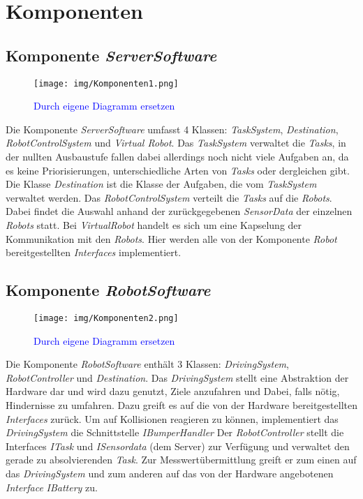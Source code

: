\section{Komponenten}

\subsection{Komponente \textit{ServerSoftware}}
\begin{figure}[H]
\centering
\texttt{[image: img/Komponenten1.png]}
\caption{\textcolor{blue}{Durch eigene Diagramm ersetzen}}
\label{KomponentenStruktur1}
\end{figure}
Die Komponente \textit{ServerSoftware} umfasst 4 Klassen: \textit{TaskSystem}, \textit{Destination}, \textit{RobotControlSystem} und \textit{Virtual Robot}.
Das \textit{TaskSystem} verwaltet die \textit{Tasks}, in der nullten Ausbaustufe fallen dabei allerdings noch nicht viele Aufgaben an, 
da es keine Priorisierungen, unterschiedliche Arten von \textit{Tasks} oder dergleichen gibt. Die Klasse \textit{Destination} ist die Klasse 
der Aufgaben, die vom \textit{TaskSystem} verwaltet werden. Das \textit{RobotControlSystem} verteilt die \textit{Tasks} auf die \textit{Robots}. 
Dabei findet die Auswahl anhand der zurückgegebenen \textit{SensorData} der einzelnen \textit{Robots} statt. Bei \textit{VirtualRobot} handelt 
es sich um eine Kapselung der Kommunikation mit den \textit{Robots}. Hier werden alle von der Komponente \textit{Robot} bereitgestellten 
\textit{Interfaces} implementiert.
\subsection{Komponente \textit{RobotSoftware}}
\begin{figure}[H]
\centering
\texttt{[image: img/Komponenten2.png]}
\caption{\textcolor{blue}{Durch eigene Diagramm ersetzen}}
\label{KomponentenStruktur2}
\end{figure}
Die Komponente \textit{RobotSoftware} enthält 3 Klassen: \textit{DrivingSystem}, \textit{RobotController} und \textit{Destination}. 
Das \textit{DrivingSystem} stellt eine Abstraktion der Hardware dar und wird dazu genutzt, Ziele anzufahren und Dabei, 
falls nötig, Hindernisse zu umfahren. Dazu greift es auf die von der Hardware bereitgestellten \textit{Interfaces} zurück. 
Um auf Kollisionen reagieren zu können, implementiert das \textit{DrivingSystem} die Schnittstelle \textit{IBumperHandler}
Der \textit{RobotController} stellt die Interfaces \textit{ITask} und \textit{ISensordata} (dem Server) zur Verfügung und verwaltet den gerade 
zu absolvierenden \textit{Task}. Zur Messwertübermittlung greift er zum einen auf das \textit{DrivingSystem} und zum anderen auf das 
von der Hardware angebotenen \textit{Interface} \textit{IBattery} zu.

